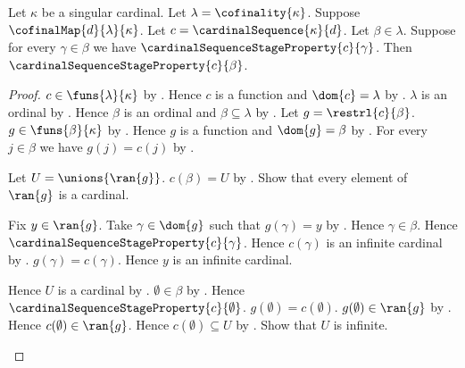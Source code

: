 \begin{proposition}\label{cardinal_sequence_stage_step}
    Let $\kappa$ be a singular cardinal.
    Let $\lambda=\cofinality{\kappa}$.
    Suppose $\cofinalMap{d}{\lambda}{\kappa}$.
    Let $c=\cardinalSequence{\kappa}{d}$.
    Let $\beta\in\lambda$.
    Suppose for every $\gamma\in\beta$ we have
        $\cardinalSequenceStageProperty{c}{\gamma}$.
    Then $\cardinalSequenceStageProperty{c}{\beta}$.
\end{proposition}
\begin{proof}
    $c\in\funs{\lambda}{\kappa}$ by .
    Hence $c$ is a function and $\dom{c}=\lambda$
        by .
    $\lambda$ is an ordinal
        by .
    Hence $\beta$ is an ordinal and $\beta\subseteq\lambda$
        by .
    Let $g=\restrl{c}{\beta}$.
    $g\in\funs{\beta}{\kappa}$
        by .
    Hence $g$ is a function and $\dom{g}=\beta$
        by .
    For every $j\in\beta$ we have $g(j)=c(j)$
        by .
    \begin{byCase}
            Let $U=\unions{\ran{g}}$.
            $c(\beta)=U$ by .
            Show that every element of $\ran{g}$ is a cardinal.
            \begin{subproof}
                Fix $y\in\ran{g}$.
                Take $\gamma\in\dom{g}$ such that $g(\gamma)=y$
                    by .
                Hence $\gamma\in\beta$.
                Hence $\cardinalSequenceStageProperty{c}{\gamma}$.
                Hence $c(\gamma)$ is an infinite cardinal
                    by .
                $g(\gamma)=c(\gamma)$.
                Hence $y$ is an infinite cardinal.
            \end{subproof}
            Hence $U$ is a cardinal
                by .
            $\emptyset\in\beta$
                by .
            Hence $\cardinalSequenceStageProperty{c}{\emptyset}$.
            $g(\emptyset)=c(\emptyset)$.
            $g(\emptyset)\in\ran{g}$ by .
            Hence $c(\emptyset)\in\ran{g}$.
            Hence $c(\emptyset)\subseteq U$
                by .
            Show that $U$ is infinite.

\end{byCase}
\end{proof}
